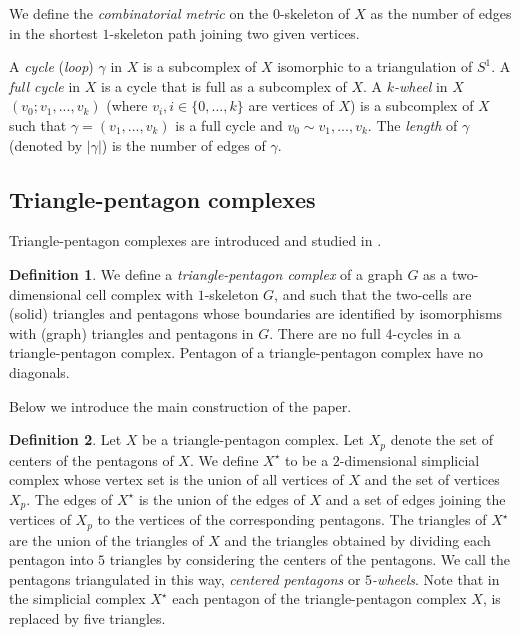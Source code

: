 \documentclass{amsart}
\theoremstyle{definition}
\newtheorem{definition}{Definition}[section]
\theoremstyle{remark}
\numberwithin{equation}{section}
\begin{document}
We define the \emph{combinatorial metric} on the $0$-skeleton of $X$ as the number of edges in the shortest $1$-skeleton path joining two given vertices.




A {\it cycle} ({\it loop}) $\gamma$ in $X$ is a subcomplex of $X$ isomorphic to a triangulation of $S^{1}$.
A \emph{full cycle} in $X$ is a cycle that is full as a subcomplex of $X$. 
A \emph{$k$-wheel} in $X$ $(v_{0}; v_{1}, ..., v_{k})$ (where $v_{i}, i \in \{0, ..., k\}$ are vertices of $X$) is a subcomplex of $X$ such that $\gamma = (v_{1}, ..., v_{k})$ is a full cycle and $v_{0} \sim v_{1}, ..., v_{k}$. The \emph{length} of $\gamma$ (denoted by $|\gamma|$) is the number of edges of $\gamma$. 


\subsection{Triangle-pentagon complexes}

Triangle-pentagon complexes are introduced and studied in \cite{CCG}.

\begin{definition}
We define a \emph{triangle-pentagon complex} of a graph $G$ as
a two-dimensional cell complex with $1$-skeleton $G$, and such that the two-cells are (solid) triangles and
pentagons whose boundaries are identified by isomorphisms with (graph) triangles and pentagons in $G$. There are no full $4$-cycles in a triangle-pentagon complex. Pentagon of a triangle-pentagon complex have no diagonals. 
\end{definition}

Below we introduce the main construction of the paper.

\begin{definition}
Let $X$ be a triangle-pentagon complex. Let $X_{p}$ denote the set of centers of the pentagons of $X$. We define $X^{\star}$ to be a $2$-dimensional simplicial complex  whose vertex set is the union of all vertices of $X$ and the set of vertices $X_{p}$. The edges of $X^{\star}$ is the union of the edges of $X$ and a set of edges joining the vertices of $X_{p}$ to the vertices of the corresponding pentagons. The triangles of $X^{\star}$ are the union of the triangles of $X$ and the triangles obtained by dividing each pentagon into $5$ triangles by considering the centers of the pentagons. We call the pentagons triangulated in this way, \emph{centered pentagons} or  \emph{$5$-wheels}. Note that in the simplicial complex $X^{\star}$ each pentagon of the triangle-pentagon complex $X$, is replaced by five triangles. 
\end{definition}
\end{document}
